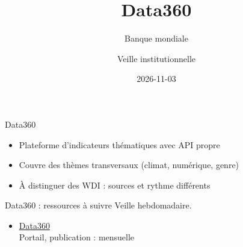 \documentclass[aspectratio=169,11pt]{beamer}
\title{Data360}
\subtitle{Banque mondiale}
\author{Veille institutionnelle}
\date{2026-11-03}
\begin{document}
\begin{frame}\titlepage\end{frame}

\begin{frame}{Data360}
\begin{itemize}
\item Plateforme d'indicateurs thématiques avec API propre
\item Couvre des thèmes transversaux (climat, numérique, genre)
\item À distinguer des WDI : sources et rythme différents
\end{itemize}
\end{frame}

\begin{frame}{Data360 : ressources à suivre}
\small
Veille hebdomadaire.
\begin{itemize}
\item \href{https://data360.worldbank.org}{Data360}\\{\footnotesize Portail, publication : mensuelle}
\end{itemize}
\end{frame}
\end{document}
